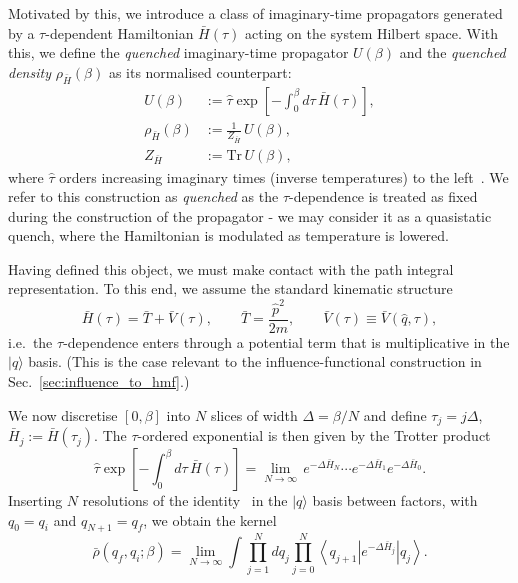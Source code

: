 ﻿\documentclass[aps,prl,twocolumn,superscriptaddress,showpacs,floatfix]{revtex4-2}
\newcommand{\Tr}{\mathrm{Tr}}
\begin{document}
Motivated by this, we introduce a class of imaginary-time propagators generated by a $\tau$-dependent Hamiltonian $\bar H(\tau)$ acting on the system Hilbert
space. With this, we define the \emph{quenched} imaginary-time propagator $U(\beta)$ and the \emph{quenched density} $\rho_{\bar H}(\beta)$ as its normalised counterpart:
\begin{equation}
\begin{split}
    U(\beta)
    &:=
    \hat\tau \exp\!\left[-\int_{0}^{\beta} d\tau\,\bar H(\tau)\right],
    \\
    \rho_{\bar H}(\beta)
    &:=
    \frac{1}{Z_{\bar H}}\, U(\beta),
    \\
    Z_{\bar H}&:=\Tr\, U(\beta),
\end{split}
    \label{eq:quenched_canonical_def}
\end{equation}
where $\hat\tau$ orders increasing imaginary times (inverse temperatures) to the left~\cite{feynmanQuantumMechanicsPath1965, kleinertPathIntegralsQuantum2009}. We refer to this construction as \emph{quenched} as the $\tau$-dependence is treated as fixed
during the construction of the propagator - we may consider it as a quasistatic quench, where the Hamiltonian is modulated as temperature is lowered.

Having defined this object, we must make contact with the   path integral representation. To this end, we assume the standard kinematic structure
\begin{equation}
    \bar H(\tau)=\bar T+\bar V(\tau),
    \qquad
    \bar T=\frac{\hat p^2}{2m},
    \qquad
    \bar V(\tau)\equiv \bar V(\hat q,\tau),
    \label{eq:quenched_T_plus_V}
\end{equation}
i.e.\ the $\tau$-dependence enters through a potential term that is multiplicative in the
$|q\rangle$ basis. (This is the case relevant to the influence-functional construction
in Sec.~\ref{sec:influence_to_hmf}.)

We now discretise $[0,\beta]$ into $N$ slices of width $\Delta=\beta/N$ and define
$\tau_j=j\Delta$, $\bar H_j:=\bar H(\tau_j)$. The $\tau$-ordered exponential is then
given by the Trotter product~\cite{kleinertPathIntegralsQuantum2009,schulmanTechniquesApplicationsPath1981}
\begin{equation}
    \hat\tau \exp\!\left[-\int_{0}^{\beta} d\tau\,\bar H(\tau)\right]
    =\lim_{N\to\infty}\, e^{-\Delta \bar H_{N}}\cdots e^{-\Delta \bar H_{1}}e^{-\Delta \bar H_{0}}.
    \label{eq:quenched_timeslice}
\end{equation}
Inserting $N$ resolutions of the identity~\cite{kleinertPathIntegralsQuantum2009} in the $|q\rangle$ basis between factors, with
$q_0=q_i$ and $q_{N+1}=q_f$, we obtain the kernel
\begin{equation}
    \bar\rho(q_f,q_i;\beta)
    =
    \lim_{N\to\infty}
    \int \prod_{j=1}^{N} dq_j
    \prod_{j=0}^{N}
    \left\langle q_{j+1}\right| e^{-\Delta \bar H_j}\left|q_j\right\rangle.
    \label{eq:quenched_kernel_product}
\end{equation}
\end{document}
